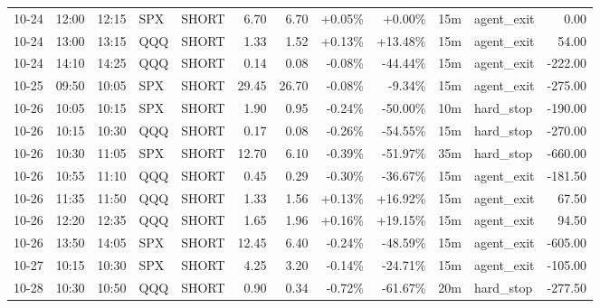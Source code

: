 \documentclass[11pt,a4paper]{article}
\begin{document}
\begin{center}
\begin{longtable}{>{\color{txtmain}}l l l l l r r r r r >{\color{txtmain}}l r}
10-24 & 12:00 & 12:15 & SPX & SHORT & 6.70 & 6.70 & \textcolor{wingreen}{+0.05\%} & \textcolor{wingreen}{+0.00\%} & 15m & agent\_exit & \textcolor{wingreen}{0.00} \\
10-24 & 13:00 & 13:15 & QQQ & SHORT & 1.33 & 1.52 & \textcolor{wingreen}{+0.13\%} & \textcolor{wingreen}{+13.48\%} & 15m & agent\_exit & \textcolor{wingreen}{54.00} \\
10-24 & 14:10 & 14:25 & QQQ & SHORT & 0.14 & 0.08 & \textcolor{lossred}{-0.08\%} & \textcolor{lossred}{-44.44\%} & 15m & agent\_exit & \textcolor{lossred}{-222.00} \\
10-25 & 09:50 & 10:05 & SPX & SHORT & 29.45 & 26.70 & \textcolor{lossred}{-0.08\%} & \textcolor{lossred}{-9.34\%} & 15m & agent\_exit & \textcolor{lossred}{-275.00} \\
10-26 & 10:05 & 10:15 & SPX & SHORT & 1.90 & 0.95 & \textcolor{lossred}{-0.24\%} & \textcolor{lossred}{-50.00\%} & 10m & hard\_stop & \textcolor{lossred}{-190.00} \\
10-26 & 10:15 & 10:30 & QQQ & SHORT & 0.17 & 0.08 & \textcolor{lossred}{-0.26\%} & \textcolor{lossred}{-54.55\%} & 15m & hard\_stop & \textcolor{lossred}{-270.00} \\
10-26 & 10:30 & 11:05 & SPX & SHORT & 12.70 & 6.10 & \textcolor{lossred}{-0.39\%} & \textcolor{lossred}{-51.97\%} & 35m & hard\_stop & \textcolor{lossred}{-660.00} \\
10-26 & 10:55 & 11:10 & QQQ & SHORT & 0.45 & 0.29 & \textcolor{lossred}{-0.30\%} & \textcolor{lossred}{-36.67\%} & 15m & agent\_exit & \textcolor{lossred}{-181.50} \\
10-26 & 11:35 & 11:50 & QQQ & SHORT & 1.33 & 1.56 & \textcolor{wingreen}{+0.13\%} & \textcolor{wingreen}{+16.92\%} & 15m & agent\_exit & \textcolor{wingreen}{67.50} \\
10-26 & 12:20 & 12:35 & QQQ & SHORT & 1.65 & 1.96 & \textcolor{wingreen}{+0.16\%} & \textcolor{wingreen}{+19.15\%} & 15m & agent\_exit & \textcolor{wingreen}{94.50} \\
10-26 & 13:50 & 14:05 & SPX & SHORT & 12.45 & 6.40 & \textcolor{lossred}{-0.24\%} & \textcolor{lossred}{-48.59\%} & 15m & agent\_exit & \textcolor{lossred}{-605.00} \\
10-27 & 10:15 & 10:30 & SPX & SHORT & 4.25 & 3.20 & \textcolor{lossred}{-0.14\%} & \textcolor{lossred}{-24.71\%} & 15m & agent\_exit & \textcolor{lossred}{-105.00} \\
10-28 & 10:30 & 10:50 & QQQ & SHORT & 0.90 & 0.34 & \textcolor{lossred}{-0.72\%} & \textcolor{lossred}{-61.67\%} & 20m & hard\_stop & \textcolor{lossred}{-277.50} \\

\end{longtable}
\end{center}
\end{document}
